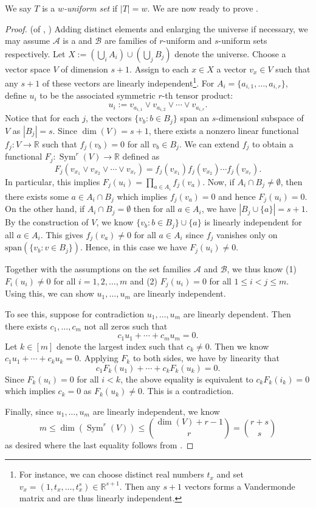 \documentclass{article}
\DeclareMathOperator{\Sym}{Sym}
\newcommand{\rr}{\mathbb{R}}
\newcommand{\<}{\langle}
\renewcommand{\>}{\rangle}
\newcommand{\calA}{\mathcal{A}}
\newcommand{\calB}{\mathcal{B}}
\begin{document}
We say $T$ is a \emph{$w$-uniform set} if $|T| = w$. We are now ready to prove .
\begin{proof}(of , \cite{Frankl1982ExtremalProblem})
    Adding distinct elements and enlarging the universe if necessary, we may assume $\calA$ is a and $\calB$ are families of $r$-uniform and $s$-uniform sets respectively. Let $X:= (\bigcup_i A_i) \cup (\bigcup_j B_j)$ denote the universe. Choose a vector space $V$ of dimension $s+1$. Assign to each $x \in X$ a vector $v_x \in V$ such that any $s+1$ of these vectors are linearly independent\footnote{For instance, we can choose distinct real numbers $t_x$ and set $v_x = (1, t_x,\ldots,t_x^{s}) \in \rr^{s+1}$. Then any $s+1$ vectors forms a Vandermonde matrix and are thus linearly independent.}. For $A_i = \{a_{i, 1},\ldots,a_{i, r}\}$, define $u_i$ to be the associated symmetric $r$-th tensor product:
    \[
    u_i := v_{a_{i, 1}} \vee v_{a_{i, 2}} \vee \cdots \vee v_{a_{i, r}}.
    \]
    Notice that for each $j$, the vectors $\{v_{b}: b \in B_j\}$ span an $s$-dimensionl subspace of $V$ as $|B_j| = s$. Since $\dim (V) = s + 1$, there exists a nonzero linear functional $f_j: V \to \rr$ such that $f_j (v_b) = 0$ for all $v_b \in B_j$. We can extend $f_j$ to obtain a functional $F_j :\Sym^r (V) \to \rr$ defined as
    \[
    F_j (v_{x_1} \vee v_{x_2} \vee \cdots \vee v_{x_r}) = f_j(v_{x_1})f_j(v_{x_2}) \cdots f_j(v_{x_r}).
    \]
    In particular, this implies $F_j(u_i) = \prod_{a \in A_i}f_j(v_a)$. Now, if $A_i \cap B_j \neq \emptyset$, then there exists some $a \in A_i \cap B_j$ which implies $f_j(v_a) = 0$ and hence $F_j (u_i) = 0$. On the other hand, if $A_i \cap B_j = \emptyset$ then for all $a \in A_i$, we have $|B_j \cup \{a\}| = s+1$. By the construction of $V$, we know $\{v_b: b \in B_j\} \cup \{a\}$ is linearly independent for all $a \in A_i$. This gives $f_j(v_a) \neq 0$ for all $a \in A_i$ since $f_j$ vanishes only on $\mathrm{span} (\{v_b: v \in B_j\})$. Hence, in this case we have $F_j(u_i) \neq 0$.

    Together with the assumptions on the set families $\calA$ and $\calB$, we thus know (1) $F_i (u_i) \neq 0$ for all $i = 1,2,\ldots,m$ and (2) $F_j (u_i) = 0$ for all $1 \leq i < j \leq m$. Using this, we can show $u_1,\ldots,u_m$ are linearly independent.

    To see this, suppose for contradiction $u_1,\ldots,u_m$ are linearly dependent. Then there exists $c_1,\ldots,c_m$ not all zeros such that
    \[
    c_1u_1 + \cdots + c_m u_m = 0.
    \]
    Let $k \in [m]$ denote the largest index such that $c_k \neq 0$. Then we know $c_1u_1 + \cdots + c_k u_k = 0$. Applying $F_k$ to both sides, we have by linearity that 
    \[
    c_1 F_k(u_1) + \cdots + c_k F_k(u_k) = 0.
    \]
    Since $F_k(u_i) = 0$ for all $i < k$, the above equality is equivalent to $c_k F_k(i_k) = 0$ which implies $c_k = 0$ as $F_k (u_k) \neq 0$. This is a contradiction.

    Finally, since $u_1,\ldots,u_m$ are linearly independent, we know
    \[
    m \leq \dim (\Sym^r (V)) \leq \binom{\dim (V) + r - 1}{r} = \binom{r+s}{s}
    \]
    as desired where the last equality follows from .
\end{proof}
\end{document}
